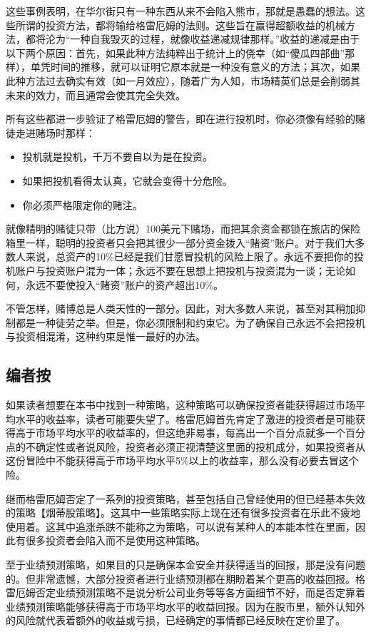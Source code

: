 \documentclass[12pt,oneside]{book}
\begin{document}
这些事例表明，在华尔街只有一种东西从来不会陷入熊市，那就是愚蠢的想法。这些所谓的投资方法，都将输给格雷厄姆的法则。这些旨在赢得超额收益的机械方法，都将沦为“一种自我毁灭的过程，就像收益递减规律那样。”收益的递减是由于以下两个原因：首先，如果此种方法纯粹出于统计上的侥幸（如“傻瓜四部曲”那样），单凭时间的推移，就可以证明它原本就是一种没有意义的方法；其次，如果此种方法过去确实有效（如一月效应），随着广为人知，市场精英们总是会削弱其未来的效力，而且通常会使其完全失效。


所有这些都进一步验证了格雷厄姆的警告，即在进行投机时，你必须像有经验的赌徒走进赌场时那样：

\begin{itemize}
\item 投机就是投机，千万不要自以为是在投资。
\item 如果把投机看得太认真，它就会变得十分危险。
\item 你必须严格限定你的赌注。
\end{itemize}


就像精明的赌徒只带（比方说）100美元下赌场，而把其余资金都锁在旅店的保险箱里一样，聪明的投资者只会把其很少一部分资金拨入“赌资”账户。对于我们大多数人来说，总资产的10\%已经是我们甘愿冒投机的风险上限了。永远不要把你的投机账户与投资账户混为一体；永远不要在思想上把投机与投资混为一谈；无论如何，永远不要使投入“赌资”账户的资产超出10\%。

不管怎样，赌博总是人类天性的一部分。因此，对大多数人来说，甚至对其稍加抑制都是一种徒劳之举。但是，你必须限制和约束它。为了确保自己永远不会把投机与投资相混淆，这种约束是惟一最好的办法。



\subsection{编者按}
如果读者想要在本书中找到一种策略，这种策略可以确保投资者能获得超过市场平均水平的收益率，读者可能要失望了。格雷厄姆首先肯定了激进的投资者是可能获得高于市场平均水平的收益率的，但这绝非易事，每高出一个百分点就多一个百分点的不确定性或者说风险，投资者必须正视清楚这里面的投机成分，如果投资者从这份冒险中不能获得高于市场平均水平5\%以上的收益率，那么没有必要去冒这个险。

继而格雷厄姆否定了一系列的投资策略，甚至包括自己曾经使用的但已经基本失效的策略【烟蒂股策略】。这其中一些策略实际上现在还有很多投资者在乐此不疲地使用着。这其中追涨杀跌不能称之为策略，可以说有某种人的本能本性在里面，因此有很多投资者会陷入而不是使用这种策略。

至于业绩预测策略，如果目的只是确保本金安全并获得适当的回报，那是没有问题的。但非常遗憾，大部分投资者进行业绩预测都在期盼着某个更高的收益回报。格雷厄姆否定业绩预测策略不是说分析公司业务等等各方面细节不好，而是否定靠着业绩预测策略能够获得高于市场平均水平的收益回报。因为在股市里，额外认知外的风险就代表着额外的收益或亏损，已经确定的事情都已经反映在定价里了。
\end{document}
